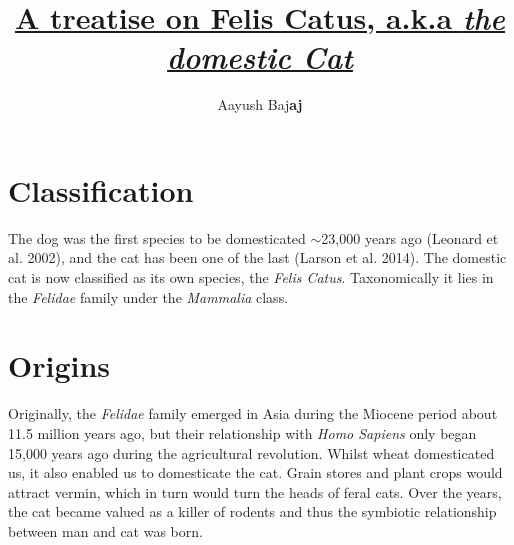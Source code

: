 \documentclass{article}
\title{\underline{A treatise on Felis Catus, a.k.a \emph{the domestic Cat}}}
\author{Aayush Baj\textbf{aj}}
\begin{document}
\maketitle{}

\pagestyle{fancy}
\dotfill

\section*{Classification}
The dog was the first species to be domesticated $\sim$23,000 years ago (Leonard et al. 2002), and the cat has been one of the last (Larson et al. 2014). The domestic cat is now classified as its own species, the \emph{Felis Catus}. Taxonomically it lies in the \emph{Felidae} family under the \emph{Mammalia} class.\\


\section*{Origins}
Originally, the \emph{Felidae} family emerged in Asia during the Miocene period about 11.5 million years ago, but their relationship with \emph{Homo Sapiens} only began 15,000 years ago during the agricultural revolution. Whilst wheat domesticated us, it also enabled us to domesticate the cat. Grain stores and plant crops would attract vermin, which in turn would turn the heads of feral cats. Over the years, the cat became valued as a killer of rodents and thus the symbiotic relationship between man and cat was born. 
\end{document}

